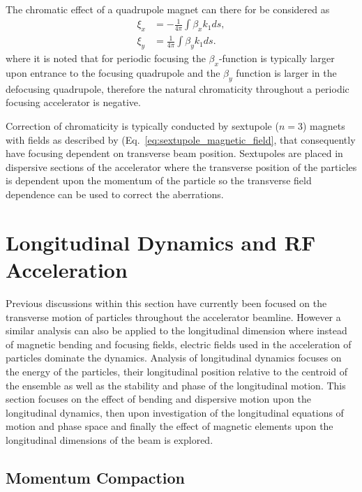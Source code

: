 \documentclass[../main.tex]{subfiles}
\begin{document}
The chromatic effect of a quadrupole magnet can there for be considered as
\begin{align}
\xi_{x} &= -\frac{1}{4\pi}\int\beta_{x}k_{1}ds, \\
\xi_{y} &= \frac{1}{4\pi}\int\beta_{y}k_{1}ds.
\label{eq:quadrupole_chromaticity}
\end{align}
where it is noted that for periodic focusing the $\beta_{x}$-function is typically larger upon entrance to the focusing quadrupole and the $\beta_{y}$ function is larger in the defocusing quadrupole, therefore the natural chromaticity throughout a periodic focusing accelerator is negative. 

Correction of chromaticity is typically conducted by sextupole ($n=3$) magnets with fields as described by (Eq.~\ref{eq:sextupole_magnetic_field}, that consequently have focusing dependent on transverse beam position. Sextupoles are placed in dispersive sections of the accelerator where the transverse position of the particles is dependent upon the momentum of the particle so the transverse field dependence can be used to correct the aberrations. 

\section{Longitudinal Dynamics and RF Acceleration}

Previous discussions within this section have currently been focused on the transverse motion of particles throughout the accelerator beamline. However a similar analysis can also be applied to the longitudinal dimension where instead of magnetic bending and focusing fields, electric fields used in the acceleration of particles dominate the dynamics. Analysis of longitudinal dynamics focuses on the energy of the particles, their longitudinal position relative to the centroid of the ensemble as well as the stability and phase of the longitudinal motion. This section focuses on the effect of bending and dispersive motion upon the longitudinal dynamics, then upon investigation of the longitudinal equations of motion and phase space and finally the effect of magnetic elements upon the longitudinal dimensions of the beam is explored.

\subsection{Momentum Compaction}
\label{sec:momentum_compaction}
\end{document}
